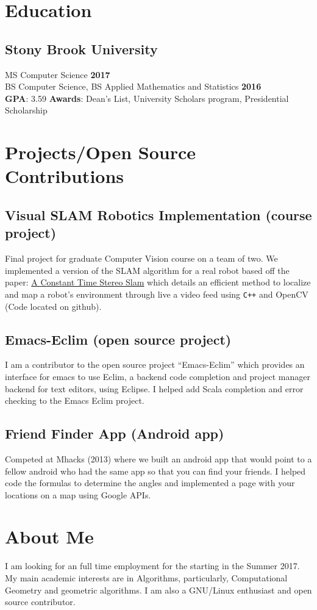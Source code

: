 \documentclass[5pt]{resume}
\begin{document}
{\color{titleColor}\section{Education}}
\subsection{\textbf{Stony Brook University }}
{\color{default}MS Computer Science} \hfill \textbf{2017}\\
{\color{default}BS Computer Science, BS Applied Mathematics and Statistics} \hfill \textbf{2016} \\ 
\textbf{GPA}: {\color{default} 3.59} 
\textbf{Awards}: {\color{default}Dean’s List, University Scholars program, Presidential Scholarship}


{\color{titleColor}\section{Projects/Open Source Contributions}}
\subsection{\textbf{Visual SLAM Robotics Implementation (course project)}}
{\color{default} Final project for graduate Computer Vision course on a team of two. We
implemented a version of the SLAM algorithm for a real robot based off the
paper: \href{
  ''http://www.robots.ox.ac.uk/~cmei/articles/AConstantTimeEfficientStereoSLAMSystem_rss_09.pdf''}{A
  Constant Time Stereo Slam} which details an efficient method to localize and
map a robot's environment through live a video feed using \verb!C++! and OpenCV (Code
located on github).}
\subsection{\textbf{Emacs-Eclim (open source project)}}
{\color{default} I am a contributor to the open source project “Emacs-Eclim”
  which provides an interface for emacs to use Eclim, a backend code completion
  and project manager backend for text editors, using Eclipse. I helped add
  Scala completion and error checking to the Emacs Eclim project. }
\subsection{\textbf{Friend Finder App (Android app)}} 
{\color{default} Competed at Mhacks (2013) where we built an android app that
  would point to a fellow android who had the same app so that you can find your
  friends. I helped code the formulas to determine the angles and implemented a
  page with your locations on a map using Google APIs.}
{\color{titleColor}\section{About Me}}
{\color{default} I am looking for an full time employment for the starting in
  the Summer 2017. My main academic interests are in Algorithms, particularly,
  Computational Geometry and geometric algorithms. I am also a GNU/Linux
  enthusiast and open source contributor.}
\\
\end{document}
